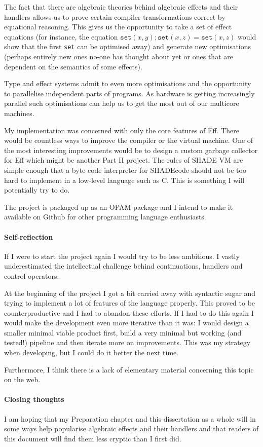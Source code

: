 \documentclass[class=article, crop=false]{standalone}
\begin{document}

The fact that there are algebraic theories behind algebraic effects and their
handlers allows us to prove certain compiler transformations correct by
equational reasoning. This gives us the opportunity to take a set of effect
equations (for instance, the equation $\mathtt{set}(x,y); \mathtt{set}(x,z) =
\mathtt{set}(x, z)$ would show that the first \texttt{set} can be optimised
away) and generate new optimisations (perhaps entirely new ones no-one has
thought about yet or ones that are dependent on the semantics of some effects).

Type and effect systems admit to even more optimisations and the opportunity to
parallelise independent parts of programs. As hardware is getting increasingly
parallel such optimisations can help us to get the most out of our multicore
machines.

My implementation was concerned with only the core features of Eff. There would
be countless ways to improve the compiler or the virtual machine. One of the
most interesting improvements would be to design a custom garbage collector for
Eff which might be another Part II project. The rules of SHADE VM are simple
enough that a byte code interpreter for SHADEcode should not be too hard to
implement in a low-level language such as C. This is something I will
potentially try to do.

The project is packaged up as an OPAM package and I intend to make it available
on Github for other programming language enthusiasts.

\paragraph{Self-reflection}

If I were to start the project again I would try to be less ambitious. I vastly
underestimated the intellectual challenge behind continuations, handlers and
control operators.

At the beginning of the project I got a bit carried away with syntactic sugar
and trying to implement a lot of features of the language properly. This proved
to be counterproductive and I had to abandon these efforts. If I had to do this
again I would make the development even more iterative than it was: I would
design a smaller minimal viable product first, build a very minimal but working
(and tested!) pipeline and then iterate more on improvements. This was my
strategy when developing, but I could do it better the next time.

Furthermore, I think there is a lack of elementary material concerning this
topic on the web. 

\paragraph{Closing thoughts}

I am hoping that my Preparation chapter and this dissertation as a whole will
in some ways help popularise algebraic effects and their handlers and that
readers of this document will find them less cryptic than I first did.
\end{document}
